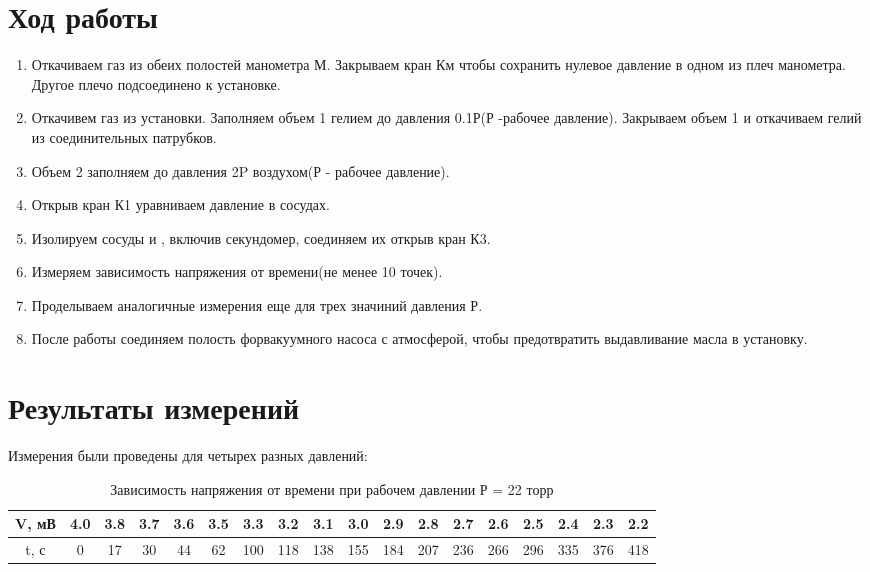 \documentclass[a4paper,12pt]{article}
\begin{document}
\section{Ход работы}

\begin{enumerate}
  \item Откачиваем газ из обеих полостей манометра М. Закрываем кран Км чтобы сохранить нулевое давление в одном из плеч манометра. Другое плечо подсоединено к установке.
  \item Откачивем газ из установки. Заполняем объем 1 гелием до давления 0.1Р(Р -рабочее давление). Закрываем объем 1 и откачиваем гелий из соединительных патрубков.
  \item Объем 2 заполняем до давления 2P воздухом(Р - рабочее давление). 
  \item Открыв кран К1 уравниваем давление в сосудах.
  \item Изолируем сосуды и , включив секундомер, соединяем их открыв кран К3.
  \item Измеряем зависимость напряжения от времени(не менее 10 точек).
  \item Проделываем аналогичные измерения еще для трех значиний давления Р.
  \item После работы соединяем полость форвакуумного насоса с атмосферой, чтобы предотвратить выдавливание масла в установку.
\end{enumerate}

\section{Результаты измерений}

Измерения были проведены для четырех разных давлений:


\begin{table}[H]
	\centering
	\begin{tabular}{|c|c|c|c|c|c|c|c|c|c|c|c|c|c|c|c|c|c|}
		\hline

		V, мВ & 4.0 & 3.8 & 3.7& 3.6& 3.5& 3.3& 3.2& 3.1& 3.0& 2.9& 2.8& 2.7& 2.6& 2.5& 2.4& 2.3&2.2\\ \hline
		t, с & 0& 17& 30& 44& 62& 100& 118& 138& 155& 184& 207& 236& 266& 296& 335& 376& 418\\ \hline
	
	\end{tabular}
	\caption{Зависимость напряжения от времени при рабочем давлении Р = 22 торр}
\end{table}
\end{document}
